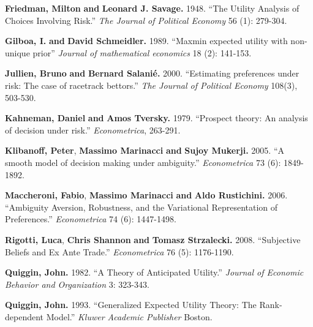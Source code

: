 \documentclass[pdftex]{article}
\numberwithin{equation}{section}
\theoremstyle{th}
\newtheorem{proof lemma}{{Proof Lemma}.}
\theoremstyle{definition}
\begin{document}
{\begin{thebibliography}{}
\textbf{Friedman, Milton} \textbf{and} \textbf{Leonard J. Savage.} 1948. ``{The Utility Analysis of Choices Involving Risk.}'' \emph{The Journal of Political Economy} 56 ({1}): 279-304.

\textbf{Gilboa, I.} \textbf{and} \textbf{David Schmeidler.} 1989. ``{Maxmin expected utility with non-unique prior}'' \emph{Journal of mathematical economics} 18 ({2}): 141-153.


\textbf{Jullien, Bruno} \textbf{and} \textbf{Bernard Salani\'{e}.} 2000. ``{Estimating preferences under risk: The case of racetrack bettors.}'' \emph{The Journal of Political Economy} 108(3), 503-530.

\textbf{Kahneman, Daniel} \textbf{and} \textbf{Amos Tversky.} 1979. ``{Prospect theory: An analysis of decision under risk.}'' \emph{Econometrica}, 263-291.


\textbf{Klibanoff, Peter}, \textbf{Massimo Marinacci} \textbf{and} \textbf{Sujoy Mukerji.} 2005. ``{A smooth model of decision making under ambiguity.}'' \emph{Econometrica} 73 ({6}): 1849-1892.

\textbf{Maccheroni, Fabio}, \textbf{Massimo Marinacci} \textbf{and} \textbf{Aldo Rustichini.} 2006. ``{Ambiguity Aversion, Robustness, and the Variational Representation of Preferences.}'' \emph{Econometrica} 74 ({6}): 1447-1498.

\textbf{Rigotti, Luca}, \textbf{Chris Shannon} \textbf{and} \textbf{Tomasz Strzalecki.} 2008. ``{Subjective Beliefs and Ex Ante Trade.}'' \emph{Econometrica} 76 ({5}): 1176-1190.

\textbf{Quiggin, John.} 1982. ``{A Theory of Anticipated Utility.}'' \emph{Journal of Economic Behavior and Organization} 3: 323-343. 

\textbf{Quiggin, John.} 1993. ``{Generalized Expected Utility Theory: The Rank-dependent Model.}'' \emph{Kluwer Academic Publisher} Boston. 


\end{thebibliography}}
\end{document}
